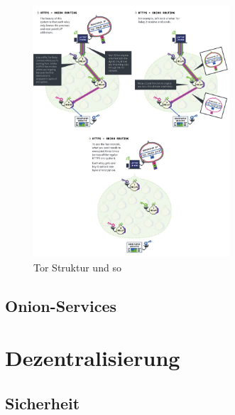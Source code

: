 \documentclass[a4paper,ngerman, headheight=28pt,12pt]{scrartcl}
\newcommand{\vcite}[1]{\cite[vgl.][]{#1}}
\begin{document}
\begin{figure}[h]
  \centering
  \includegraphics[width=0.65\textwidth]{tor_vertical.png}
  \caption{Tor Struktur und so \vcite{fig:Tor-Structure} \label{fig:TorStructure}}
\end{figure}
\subsection{Onion-Services}



\section{Dezentralisierung}
\subsection{Sicherheit}
\end{document}
